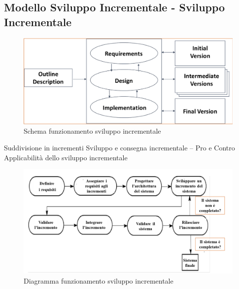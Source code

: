 \documentclass{article}
\begin{document}
	\subsection{Modello Sviluppo Incrementale - Sviluppo Incrementale}
	\begin{figure}[h]
		\centering
		\includegraphics[scale=0.3]{7.svil_inc.png}
		\caption{Schema funzionamento sviluppo incrementale}
	\end{figure}
	Suddivisione in incrementi
	Sviluppo e consegna incrementale – Pro e Contro
	Applicabilità dello sviluppo incrementale
	\begin{figure}[h]
		\centering
		\includegraphics[scale=0.3]{8.diag_svil_inc.png}
		\caption{Diagramma funzionamento sviluppo incrementale}
	\end{figure}
\end{document}
